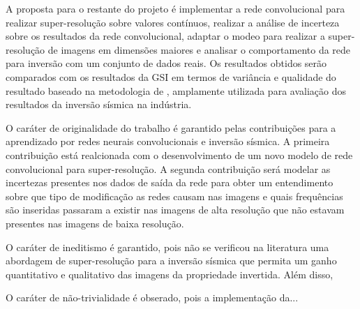 A proposta para o restante do projeto é implementar a rede convolucional para
realizar super-resolução sobre valores contínuos, realizar a análise de incerteza
sobre os resultados da rede convolucional, adaptar o modeo para realizar a super-resolução
de imagens em dimensões maiores e analisar o comportamento da rede para inversão
com um conjunto de dados reais.
Os resultados obtidos serão comparados com os resultados da GSI em
termos de variância e qualidade do resultado baseado na metodologia de
\cite{coleou_qualityanomalyinv}, amplamente utilizada para avaliação dos
resultados da inversão sísmica na indústria.
% 
% 

O caráter de originalidade do trabalho é garantido pelas contribuições para a
aprendizado por redes neurais convolucionais e inversão sísmica.
A primeira contribuição está realcionada com o desenvolvimento de um
novo modelo de rede convolucional para super-resolução.
A segunda contribuição será modelar as incertezas presentes nos dados
de saída da rede para obter um entendimento sobre que tipo de modificação
as redes causam nas imagens e quais frequências são inseridas passaram a existir
nas imagens de alta resolução que não estavam presentes nas imagens de baixa resolução.

O caráter de ineditismo é garantido, pois não se verificou na literatura uma
abordagem de super-resolução para a inversão sísmica que permita um
ganho quantitativo e qualitativo das imagens da propriedade invertida.
Além disso, 

O caráter de não-trivialidade é obserado, pois a implementação da...


